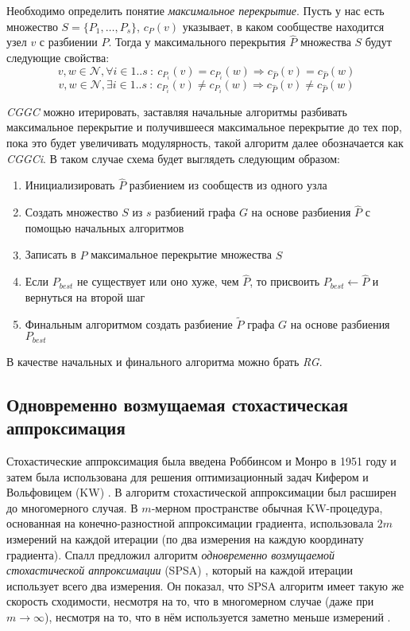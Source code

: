 Необходимо определить понятие \emph{максимальное перекрытие}. Пусть у нас есть множество $S = \{P_1, \dots, P_s\}$, $c_P(v)$ указывает, в каком сообществе находится узел $v$ с разбиении $P$.
Тогда у максимального перекрытия $\hat{P}$ множества $S$ будут следующие свойства:
$$v, w \in \mathscr{N}, \forall i \in 1..s\ :\ c_{P_i}(v) = c_{P_i}(w) \Rightarrow c_{\hat{P}}(v) = c_{\hat{P}}(w)$$
$$v, w \in \mathscr{N}, \exists i \in 1..s\ :\ c_{P_i}(v) \ne c_{P_i}(w) \Rightarrow c_{\hat{P}}(v) \ne c_{\hat{P}}(w)$$

\emph{CGGC} можно итерировать, заставляя начальные алгоритмы разбивать максимальное перекрытие и получившееся максимальное перекрытие до тех пор, пока это будет увеличивать модулярность, такой алгоритм далее обозначается как \emph{CGGCi}. В таком случае схема будет выглядеть следующим образом:

\begin{enumerate}
	\item Инициализировать $\hat{P}$ разбиением из сообществ из одного узла
	\item Создать множество $S$ из $s$ разбиений графа $G$ на основе разбиения $\hat{P}$ с помощью начальных алгоритмов
	\item Записать в $\hat{P}$ максимальное перекрытие множества $S$
	\item Если $P_{best}$ не существует или оно хуже, чем $\hat{P}$, то присвоить $P_{best} \leftarrow \hat{P}$ и вернуться на второй шаг
	\item Финальным алгоритмом создать разбиение $\widetilde{P}$ графа $G$ на основе разбиения $P_{best}$ 
\end{enumerate}

В качестве начальных и финального алгоритма можно брать \emph{RG}.



\subsection{Одновременно возмущаемая стохастическая аппроксимация}
Стохастические аппроксимация была введена Роббинсом и Монро в 1951 году \cite{Robbins&Monro:1951} и затем была использована для решения оптимизационный задач Кифером и Вольфовицем (KW) \cite{Kiefer&Wolfowitz:1952}. В \cite{Blum:1954} алгоритм стохастической аппроксимации был расширен до многомерного случая. В $m$-мерном пространстве обычная KW-процедура, основанная на конечно-разностной аппроксимации градиента, использовала $2m$ измерений на каждой итерации (по два измерения на каждую координату градиента). Спалл предложил алгоритм \emph{одновременно возмущаемой стохастической аппроксимации} (SPSA) \cite{Spall:1992}, который на каждой итерации использует всего два измерения. Он показал, что SPSA алгоритм имеет такую же скорость сходимости, несмотря на то, что в многомерном случае (даже при $m \to \infty$), несмотря на то, что в нём используется заметно меньше измерений \cite{Spall:2005}.

